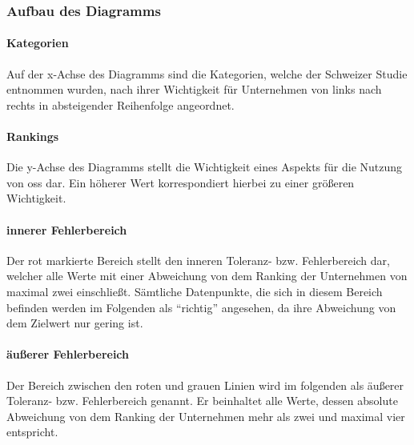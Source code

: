\documentclass[a4paper]{article}
\begin{document}
            \subsubsection{Aufbau des Diagramms}
                \paragraph{Kategorien}
                    Auf der x-Achse des Diagramms sind die Kategorien, welche der Schweizer Studie entnommen wurden, nach ihrer Wichtigkeit für Unternehmen von links nach rechts in absteigender Reihenfolge angeordnet.
                    
                \paragraph{Rankings}
                    Die y-Achse des Diagramms stellt die Wichtigkeit eines Aspekts für die Nutzung von \gls{oss} dar. Ein höherer Wert korrespondiert hierbei zu einer größeren Wichtigkeit.
                    
                \paragraph{innerer Fehlerbereich}
                    Der rot markierte Bereich stellt den inneren Toleranz- bzw. Fehlerbereich dar, welcher alle Werte mit einer Abweichung von dem Ranking der Unternehmen von maximal zwei einschließt. Sämtliche Datenpunkte, die sich in diesem Bereich befinden werden im Folgenden als ``richtig'' angesehen, da ihre Abweichung von dem Zielwert nur gering ist.

                \paragraph{äußerer Fehlerbereich}
                    Der Bereich zwischen den roten und grauen Linien wird im folgenden als äußerer Toleranz- bzw. Fehlerbereich genannt. Er beinhaltet alle Werte, dessen absolute Abweichung von dem Ranking der Unternehmen mehr als zwei und maximal vier entspricht.
                    
\end{document}
